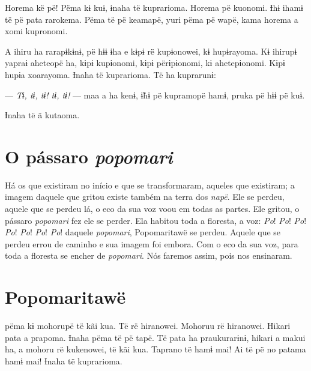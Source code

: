 Horema kë pë! Pëma kɨ kuɨ, ɨnaha të kuprarioma. Horema pë kuonomi. Ɨhɨ
ihamɨ të pë pata rarokema. Pëma të pë keamapë, yuri pëma pë wapë, kama
horema a xomi kupronomi. 

A ihiru ha rarapɨkɨnɨ, pë hɨɨ ɨha e kɨpɨ rë kupɨonowei, kɨ hupɨrayoma.
Kɨ ihirupɨ yapraɨ aheteopë ha, kɨpɨ kupɨonomi, kɨpɨ përɨpɨonomi, kɨ
ahetepɨonomi. Kɨpɨ hupɨa xoarayoma. Ɨnaha të kuprarioma. Të ha
kuprarunɨ: 

--- \textit{Tɨ, tɨ, tɨ! tɨ, tɨ!} --- maa a ha kenɨ, ɨ̃hɨ pë kupramopë hamɨ, pruka
pë hɨɨ pë kuɨ. 

Ɨnaha të ã kutaoma.

\chapter{O pássaro \textit{popomari}}

  

Há os que existiram no início e que se transformaram, aqueles que
existiram; a imagem daquele que gritou existe também na terra
dos \textit{napë}. Ele se perdeu, aquele que se perdeu lá, o eco da sua
voz voou em todas as partes. Ele gritou, o pássaro \textit{popomari} fez
ele se perder. Ela habitou toda a floresta, a voz: \textit{Po}! \textit{Po}! \textit{Po}! \textit{Po}! \textit{Po}!
\textit{Po}! \textit{Po}! daquele \textit{popomari}, Popomaritawë se perdeu. Aquele que se
perdeu errou de caminho e sua imagem foi embora. Com o eco da sua voz,
para toda a floresta se encher de \textit{popomari}. Nós faremos assim,
pois nos ensinaram. 


\chapter{Popomaritawë}
 
 pëma kɨ mohorupë të kãi kua. Të rë hiranowei. Mohoruu rë
hiranowei. Hikari pata a prapoma. Ɨnaha pëma të pë tapë. Të pata ha
praukurarɨnɨ, hikari a makui ha, a mohoru rë kukenowei, të kãi kua.
Taprano të hamɨ mai! Ai të pë no patama hamɨ mai! Ɨnaha të kuprarioma. 


